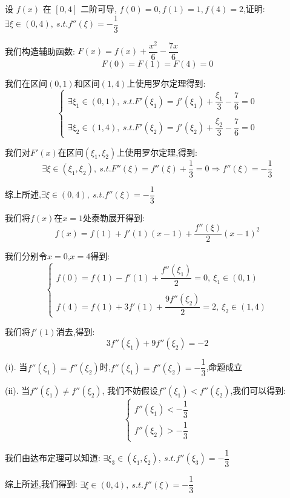 \begin{proposition}
	设 $f(x)$ 在 $[0,4]$ 二阶可导, $f(0)=0,f(1)=1,f(4)=2$,证明: $\exists \xi\in(0,4),\ s.t. f''(\xi)=-\dfrac{1}{3}$
\end{proposition}
\begin{solution}

	我们构造辅助函数:  $F(x)=f(x)+\dfrac{x^2}{6}-\dfrac{7x}{6}$
	$$F(0)=F(1)=F(4)=0$$

	我们在区间$(0,1)$和区间$(1,4)$上使用罗尔定理得到:
	$$\left\lbrace
		\begin{array}{l}
			\exists \xi_{1}\in(0,1),\ s.t. F'(\xi_{1})=f'(\xi_{1})+\dfrac{\xi_{1}}{3}-\dfrac{7}{6}=0 \\

			\\
			\exists \xi_{2}\in(1,4),\ s.t. F'(\xi_{2})=f'(\xi_{2})+\dfrac{\xi_{2}}{3}-\dfrac{7}{6}=0
		\end{array}
		\right.$$

	我们对$F'(x)$在区间$(\xi_{1},\xi_{2})$上使用罗尔定理,得到:
	$$\exists \xi\in(\xi_{1},\xi_{2}),\ s.t. F''(\xi)=f''(\xi)+\dfrac{1}{3}=0\Rightarrow f''(\xi)=-\dfrac{1}{3}$$

	综上所述,$\exists \xi\in(0,4),\ s.t. f''(\xi)=-\dfrac{1}{3}$
\end{solution}
\begin{anymark}[注: 泰勒展开]
	我们将$f(x)$在$x=1$处泰勒展开得到:
	$$f(x)=f(1)+f'(1)(x-1)+\dfrac{f''(\xi)}{2}(x-1)^2$$

	我们分别令$x=0$,$x=4$得到:
	$$\left\lbrace
		\begin{array}{l}
			f(0)=f(1)-f'(1)+\dfrac{f''(\xi_{1})}{2}=0,\ \xi_{1}\in(0,1) \\
			\\
			f(4)=f(1)+3f'(1)+\dfrac{9f''(\xi_{2})}{2}=2,\ \xi_{2}\in(1,4)
		\end{array}
		\right. $$

	我们将$f'(1)$消去,得到:
	$$3f''(\xi_{1})+9f''(\xi_{2})=-2$$

	(i). 当$f''(\xi_{1})=f''(\xi_{2})$时,$f''(\xi_{1})=f''(\xi_{2})=-\dfrac{1}{3}$,命题成立

	(ii). 当$f''(\xi_{1})\neq f''(\xi_{2})$, 我们不妨假设$f''(\xi_{1})<f''(\xi_{2})$,我们可以得到:
	$$\left\lbrace
		\begin{array}{l}
			f''(\xi_{1})<-\dfrac{1}{3} \\
			f''(\xi_{2})>-\dfrac{1}{3}
		\end{array}
		\right. $$

	我们由达布定理可以知道: $\exists \xi_{3}\in(\xi_{1},\xi_{2}),\ s.t. f''(\xi_{3})=-\dfrac{1}{3}$

	综上所述,我们得到: $\exists\xi\in(0,4),\ s.t. f''(\xi)=-\dfrac{1}{3}$
\end{anymark}

